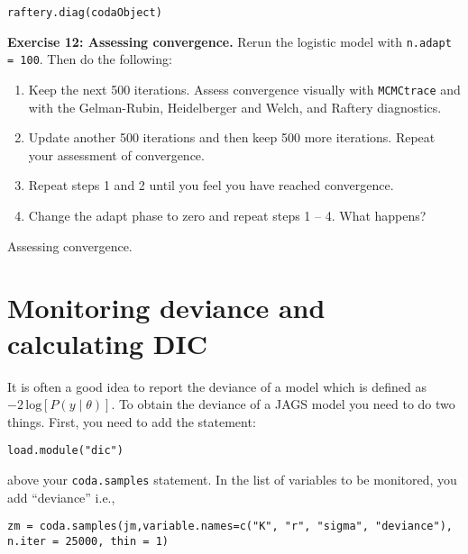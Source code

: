 \documentclass[12pt,english]{article}
\begin{document}
\bigskip
\noindent\texttt{raftery.diag(codaObject)}

\bigskip
\belowcaptionskip=-40pt
\begin{exercise}
\begin{mdframed}
\doublespacing
\textbf{Exercise 12: Assessing convergence.} Rerun the logistic model with \texttt{n.adapt = 100}. Then do the following:
\begin{enumerate}
\item Keep the next 500 iterations. Assess convergence visually with \texttt{MCMCtrace} and with the Gelman-Rubin, Heidelberger and Welch, and Raftery diagnostics.
\item Update another 500 iterations and then keep 500 more iterations. Repeat your assessment of convergence. 
\item Repeat steps 1 and 2 until you feel you have reached convergence.
\item Change the adapt phase to zero and repeat steps 1 -- 4. What happens?
\end{enumerate}
\end{mdframed}
\captionsetup{textformat=empty, labelformat=empty}
\caption[Assessing convergence]{Assessing convergence.}
\label{ex:assessing convergence}
\end{exercise}
\belowcaptionskip=0pt





\section{Monitoring deviance and calculating DIC}

It is often a good idea to report the deviance of a model which is defined as $-2\,\textrm{log}\left[P\left(y\mid\theta\right)\right]$. To obtain the deviance of a JAGS model you need to do two things. First, you need to add the statement:

\begin{Verbatim}
load.module("dic")
\end{Verbatim}

\noindent above your \texttt{coda.samples} statement. In the list of variables to be monitored, you add \enquote{deviance} i.e.,

\begin{Verbatim}
zm = coda.samples(jm,variable.names=c("K", "r", "sigma", "deviance"), 
n.iter = 25000, thin = 1)
\end{Verbatim}
\end{document}
